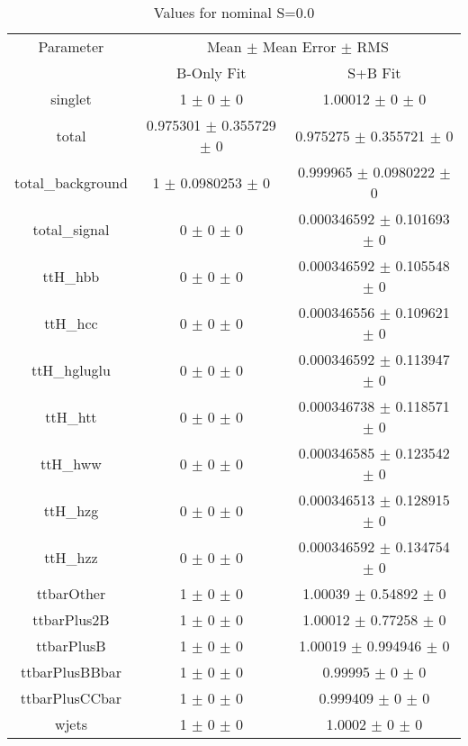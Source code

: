 \begin{table}
\centering
\caption{Values for nominal S=0.0}
\begin{tabular}{ccc}
\toprule
Parameter & \multicolumn{2}{c}{Mean $\pm$ Mean Error $\pm$ RMS}\\
 & B-Only Fit & S+B Fit\\
\midrule
singlet & \num{1} $\pm$ \num{0} $\pm$ \num{0} & \num{1.00012} $\pm$ \num{0} $\pm$ \num{0}\\
total & \num{0.975301} $\pm$ \num{0.355729} $\pm$ \num{0} & \num{0.975275} $\pm$ \num{0.355721} $\pm$ \num{0}\\
total\_background & \num{1} $\pm$ \num{0.0980253} $\pm$ \num{0} & \num{0.999965} $\pm$ \num{0.0980222} $\pm$ \num{0}\\
total\_signal & \num{0} $\pm$ \num{0} $\pm$ \num{0} & \num{0.000346592} $\pm$ \num{0.101693} $\pm$ \num{0}\\
ttH\_hbb & \num{0} $\pm$ \num{0} $\pm$ \num{0} & \num{0.000346592} $\pm$ \num{0.105548} $\pm$ \num{0}\\
ttH\_hcc & \num{0} $\pm$ \num{0} $\pm$ \num{0} & \num{0.000346556} $\pm$ \num{0.109621} $\pm$ \num{0}\\
ttH\_hgluglu & \num{0} $\pm$ \num{0} $\pm$ \num{0} & \num{0.000346592} $\pm$ \num{0.113947} $\pm$ \num{0}\\
ttH\_htt & \num{0} $\pm$ \num{0} $\pm$ \num{0} & \num{0.000346738} $\pm$ \num{0.118571} $\pm$ \num{0}\\
ttH\_hww & \num{0} $\pm$ \num{0} $\pm$ \num{0} & \num{0.000346585} $\pm$ \num{0.123542} $\pm$ \num{0}\\
ttH\_hzg & \num{0} $\pm$ \num{0} $\pm$ \num{0} & \num{0.000346513} $\pm$ \num{0.128915} $\pm$ \num{0}\\
ttH\_hzz & \num{0} $\pm$ \num{0} $\pm$ \num{0} & \num{0.000346592} $\pm$ \num{0.134754} $\pm$ \num{0}\\
ttbarOther & \num{1} $\pm$ \num{0} $\pm$ \num{0} & \num{1.00039} $\pm$ \num{0.54892} $\pm$ \num{0}\\
ttbarPlus2B & \num{1} $\pm$ \num{0} $\pm$ \num{0} & \num{1.00012} $\pm$ \num{0.77258} $\pm$ \num{0}\\
ttbarPlusB & \num{1} $\pm$ \num{0} $\pm$ \num{0} & \num{1.00019} $\pm$ \num{0.994946} $\pm$ \num{0}\\
ttbarPlusBBbar & \num{1} $\pm$ \num{0} $\pm$ \num{0} & \num{0.99995} $\pm$ \num{0} $\pm$ \num{0}\\
ttbarPlusCCbar & \num{1} $\pm$ \num{0} $\pm$ \num{0} & \num{0.999409} $\pm$ \num{0} $\pm$ \num{0}\\
wjets & \num{1} $\pm$ \num{0} $\pm$ \num{0} & \num{1.0002} $\pm$ \num{0} $\pm$ \num{0}\\
\bottomrule
\end{tabular}
\end{table}